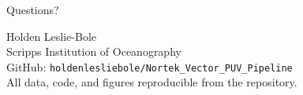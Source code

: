 \documentclass[10pt, aspectratio=169]{beamer}
\begin{document}
\begin{frame}
  \begin{center}
    {\Huge Questions?}

    \vspace{1em}
    {\large Holden Leslie-Bole}\\
    Scripps Institution of Oceanography\\[0.5em]
    {\footnotesize
    GitHub: \texttt{holdenlesliebole/Nortek\_Vector\_PUV\_Pipeline}\\
    All data, code, and figures reproducible from the repository.}
  \end{center}
\end{frame}

\end{document}
